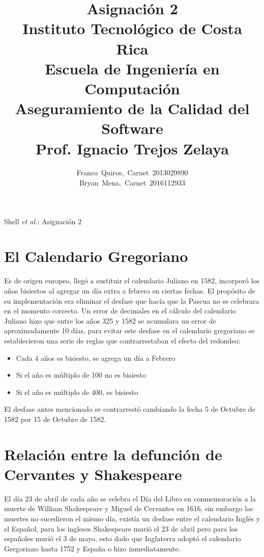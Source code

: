 \documentclass[10pt,journal,compsoc]{IEEEtran}
\begin{document}
	\title{Asignaci\'on 2 \\ \large Instituto Tecnol\'ogico de Costa Rica \\ Escuela de Ingenier\'ia en Computaci\'on\\ Aseguramiento de la Calidad del Software\\ Prof. Ignacio Trejos Zelaya}
	
	
	\author{Franco~Quiros,~Carnet~2013029890\\ Bryan~Mena,~Carnet~2016112933 }
	
	{Shell \MakeLowercase{\textit{et al.}}: Asignaci\'on 2}
	\maketitle
	
	\IEEEdisplaynontitleabstractindextext
	
	\IEEEpeerreviewmaketitle
	
	\section{El Calendario Gregoriano}
	\par Es de origen europeo, llegó a sustituir el calendario Juliano en 1582, incorporó los años bisiestos al agregar un día extra a febrero en ciertas fechas. El propósito de su implementación era eliminar el desfase que hacía que la Pascua no se celebrara en el momento correcto. Un error de decimales en el cálculo del calendario Juliano hizo que entre los años 325 y 1582 se acumulara un error de aproximadamente 10 días, para evitar este desfase en el calendario gregoriano se establecieron una serie de reglas que contrarrestaban el efecto del redondeo:
	\begin{itemize}
		\item Cada 4 años es bisiesto, se agrega un día a Febrero
		\item Si el año es múltiplo de 100 no es bisiesto
		\item Si el año es múltiplo de 400, es bisiesto
	\end{itemize}
	\par El desfase antes mencionado se contrarrestó cambiando la fecha 5 de Octubre de 1582 por 15 de Octubre de 1582.
	
	\section{Relación entre la defunción de Cervantes y Shakespeare}
	\par El día 23 de abril de cada año se celebra el Día del Libro en conmemoración a la muerte de William Shakespeare y Miguel de Cervantes en 1616, sin embargo las muertes no sucedieron el mismo día, existía un desfase entre el calendario Inglés y el Español, para los ingleses Shakespeare murió el 23 de abril pero para los españoles murió el 3 de mayo, esto dado que Inglaterra adoptó el calendario Gregoriano hasta 1752 y España o hizo inmediatamente.
	
\end{document}
